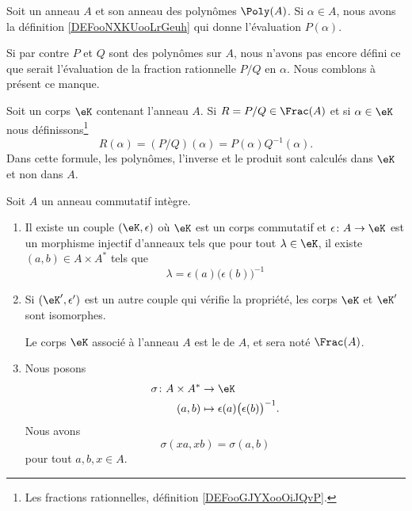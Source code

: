 \begin{normaltext}
	Soit un anneau \( A\) et son anneau des polynômes \( \Poly(A)\). Si \( \alpha\in A\), nous avons la définition \ref{DEFooNXKUooLrGeuh} qui donne l'évaluation \( P(\alpha)\).

	Si par contre \( P\) et \( Q\) sont des polynômes sur \( A\), nous n'avons pas encore défini ce que serait l'évaluation de la fraction rationnelle \( P/Q\) en \( \alpha\). Nous comblons à présent ce manque.
\end{normaltext}

\begin{definition}       \label{DEFooLBIWooCPCaSY}
	Soit un corps \( \eK\) contenant l'anneau \( A\). Si \( R=P/Q\in \Frac(A)\) et si \( \alpha\in \eK\) nous définissons\footnote{Les fractions rationnelles, définition \ref{DEFooGJYXooOiJQvP}.}
	\begin{equation}
		R(\alpha)=(P/Q)(\alpha)=P(\alpha)Q^{-1}(\alpha).
	\end{equation}
	Dans cette formule, les polynômes, l'inverse et le produit sont calculés dans \( \eK\) et non dans \( A\).
\end{definition}

\begin{theoremDef}     \label{ThogbhWgo}
	Soit \( A\) un anneau commutatif intègre.

	\begin{enumerate}
		\item
		      Il existe un couple \( (\eK,\epsilon)\) où \( \eK\) est un corps commutatif et \( \epsilon\colon A\to \eK\) est un morphisme injectif d'anneaux tels que pour tout \( \lambda\in\eK\), il existe \( (a,b)\in A\times A^*\) tels que
		      \begin{equation}
			      \lambda=\epsilon(a)\big( \epsilon(b) \big)^{-1}
		      \end{equation}
		\item
		      Si \( (\eK',\epsilon')\) est un autre couple qui vérifie la propriété, les corps \( \eK\) et \( \eK'\) sont isomorphes.

		      Le corps \( \eK\) associé à l'anneau \( A\) est le  de \( A\), et sera noté \( \Frac(A)\).

		\item
		      Nous posons
		      \begin{equation}
			      \begin{aligned}
				      \sigma\colon A\times A^* & \to \eK                                          \\
				      (a,b)                    & \mapsto \epsilon(a)\big( \epsilon(b) \big)^{-1}.
			      \end{aligned}
		      \end{equation}
		      Nous avons
		      \begin{equation}
			      \sigma(xa, xb)=\sigma(a,b)
		      \end{equation}
		      pour tout \( a,b,x\in A\).
	\end{enumerate}
\end{theoremDef}

